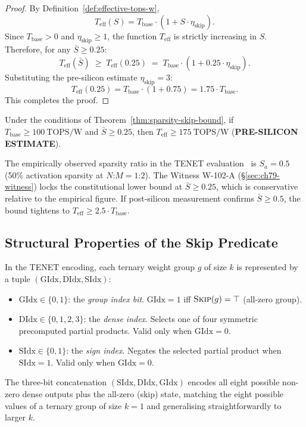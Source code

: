 \begin{proof}
By Definition~\ref{def:effective-tops-w},
\[
  T_{\mathrm{eff}}(S) = T_{\mathrm{base}} \cdot (1 + S \cdot \eta_{\mathrm{skip}}).
\]
Since $T_{\mathrm{base}} > 0$ and $\eta_{\mathrm{skip}} \geq 1$,
the function $T_{\mathrm{eff}}$ is strictly increasing in $S$.
Therefore, for any $\bar{S} \geq 0.25$:
\[
  T_{\mathrm{eff}}(\bar{S})
    \;\geq\; T_{\mathrm{eff}}(0.25)
    \;=\; T_{\mathrm{base}} \cdot (1 + 0.25 \cdot \eta_{\mathrm{skip}}).
\]
Substituting the pre-silicon estimate $\eta_{\mathrm{skip}} = 3$:
\[
  T_{\mathrm{eff}}(0.25) = T_{\mathrm{base}} \cdot (1 + 0.75)
    = 1.75 \cdot T_{\mathrm{base}}.
\]
This completes the proof.
\end{proof}

\begin{corollary}
\label{cor:sparsity-skip-corollary}
Under the conditions of Theorem~\ref{thm:sparsity-skip-bound},
if $T_{\mathrm{base}} \geq 100~\text{TOPS/W}$ and
$\bar{S} \geq 0.25$, then $T_{\mathrm{eff}} \geq 175~\text{TOPS/W}$
(\textbf{PRE-SILICON ESTIMATE}).
\end{corollary}

\begin{remark}
The empirically observed sparsity ratio in the TENET evaluation~\cite{huang2025tenet}
is $S_a = 0.5$ (50\% activation sparsity at $N$:$M = 1$:$2$).
The Witness W-102-A (§\ref{sec:ch79-witness}) locks the constitutional
lower bound at $\bar{S} \geq 0.25$, which is conservative relative to
the empirical figure.
If post-silicon measurement confirms $\bar{S} \geq 0.5$, the bound
tightens to $T_{\mathrm{eff}} \geq 2.5 \cdot T_{\mathrm{base}}$.
\end{remark}

\subsection{Structural Properties of the Skip Predicate}
\label{subsec:ch79-structural-props}

\begin{definition}
\label{def:gidx-field}
In the TENET encoding, each ternary weight group $g$ of size $k$ is
represented by a tuple $(\text{GIdx}, \text{DIdx}, \text{SIdx})$:
\begin{itemize}
  \item $\text{GIdx} \in \{0, 1\}$: the \emph{group index bit}.
        $\text{GIdx} = 1$ iff $\textsc{Skip}(g) = \top$ (all-zero group).
  \item $\text{DIdx} \in \{0, 1, 2, 3\}$: the \emph{dense index}.
        Selects one of four symmetric precomputed partial products.
        Valid only when $\text{GIdx} = 0$.
  \item $\text{SIdx} \in \{0, 1\}$: the \emph{sign index}.
        Negates the selected partial product when $\text{SIdx} = 1$.
        Valid only when $\text{GIdx} = 0$.
\end{itemize}
The three-bit concatenation $(\text{SIdx}, \text{DIdx}, \text{GIdx})$
encodes all eight possible non-zero dense outputs plus the all-zero
(skip) state, matching the eight possible values of a ternary group
of size $k = 1$ and generalising straightforwardly to larger $k$.
\end{definition}


